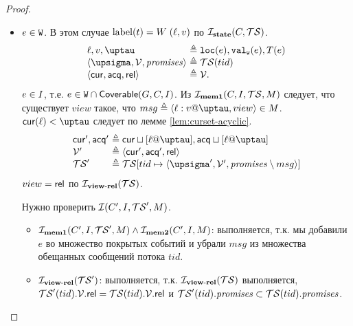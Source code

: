\begin{proof}
\begin{itemize}
        \item $e \in {\mathtt{W}}$.
          В этом случае ${\rm label}(t) = W \; (\ell, v)$ по $\mathcal{I}_{\rm \bf state}(C, \mathcal{TS})$.
          \[\begin{array}{l@{~}l}
            \loc, \val, \tau        & \defeq \lLOC(e), \lVALW(e), T(e) \\
            \tup{\pstate, \View, \PromSet} & \defeq \TSf(tid) \\
            \tup{\viewCur, \viewAcq, \viewRel} & \defeq \View. \\
          \end{array}\]
          $e \in I$, т.е. $e \in {\mathtt{W}} \cap {\sf Coverable}(G, C, I)$.
          Из $\mathcal{I}_{\rm \bf mem1}(C, I, \mathcal{TS}, M)$ следует, что существует $view$ такое, что
          $msg \defeq \msg{\loc}{\val}{\tau}{view} \in M$.
          $\viewCur(\loc) < \tau$ следует по лемме \ref{lem:curset-acyclic}.
          \[\begin{array}{l@{~}l}
            \viewCur', \viewAcq' & \defeq \viewCur \sqcup [\loc @ \tau], \viewAcq \sqcup [\loc @ \tau] \\
            \View'    & \defeq \tup{\viewCur', \viewAcq', \viewRel} \\
            \TSf'     & \defeq \TSf[tid \mapsto \tup{\pstate', \View', \PromSet \setminus msg}] \\
          \end{array}\]
          $view = {\sf rel}$ по $\mathcal{I}_{\rm \bf view\text{-}rel}(\mathcal{TS})$.

          Нужно проверить $\mathcal{I}(C', I, \mathcal{TS}', M)$.
        \begin{itemize}
        \item $\mathcal{I}_{\rm \bf mem1}(C', I, \mathcal{TS}', M) \land \mathcal{I}_{\rm \bf mem2}(C', I, M)$:
          выполняется, т.к. мы добавили $e$ во множество покрытых событий и убрали $msg$ из множества
          обещанных сообщений потока $tid$.

        \item $\mathcal{I}_{\rm \bf view\text{-}rel}(\mathcal{TS}')$: выполняется, т.к. $\mathcal{I}_{\rm \bf view\text{-}rel}(\mathcal{TS})$ выполняется, \\
          $\mathcal{TS}'(tid).\mathcal{V}.{\sf rel} = \mathcal{TS}(tid).\mathcal{V}.{\sf rel}$ и
          $\mathcal{TS}'(tid).\mathit{promises} \subset \mathcal{TS}(tid).\mathit{promises}$.


\end{itemize}
\end{itemize}
\end{proof}
